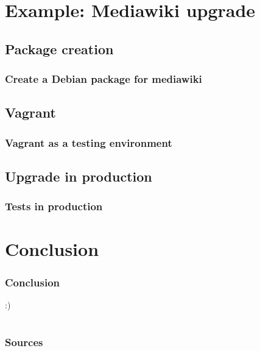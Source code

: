 \documentclass[11pt,compress]{beamer}
\begin{document}
\section{Example: Mediawiki upgrade}
\subsection{Package creation}
\begin{frame}
\frametitle{Create a Debian package for mediawiki}
\end{frame}

\subsection{Vagrant}
\begin{frame}
\frametitle{Vagrant as a testing environment}
\end{frame}

\subsection{Upgrade in production}
\begin{frame}
\frametitle{Tests in production}
\end{frame}

\section{Conclusion}
\begin{frame}
\frametitle{Conclusion}
:)
\end{frame}

\section*{}
\begin{frame}
\frametitle{Sources}

\end{frame}
\end{document}
